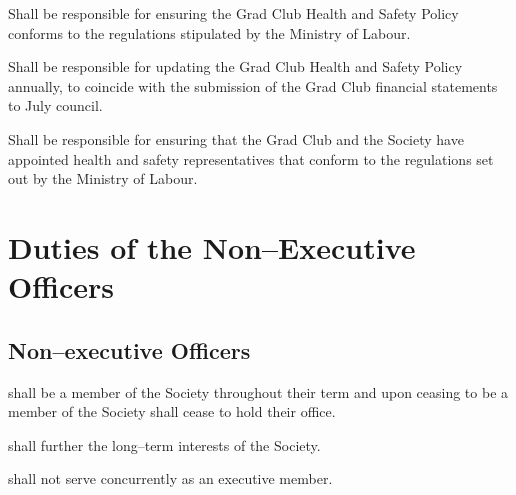 \begin{longenum}[ label*=\thesubsection.\arabic*., align=left]
    \item Shall be responsible for ensuring the Grad Club Health and Safety Policy conforms to the regulations stipulated by the Ministry of Labour.
    \item Shall be responsible for updating the Grad Club Health and Safety Policy annually, to coincide with the submission of the Grad Club financial statements to July council.
    \item Shall be responsible for ensuring that the Grad Club and the Society have appointed health and safety representatives that conform to the regulations set out by the Ministry of Labour.
    
\end{longenum}

\newpage

\section{Duties of the Non--Executive Officers}
\subsection {Non--executive Officers} 
\begin{longenum}[ label*=\thesubsection.\arabic*., align=left]
	\item shall be a member of the Society throughout their term and upon ceasing to be a member of the Society shall cease to hold their office.
	\item shall further the long--term interests of the Society.
    \item shall not serve concurrently as an executive member.
\end{longenum}
